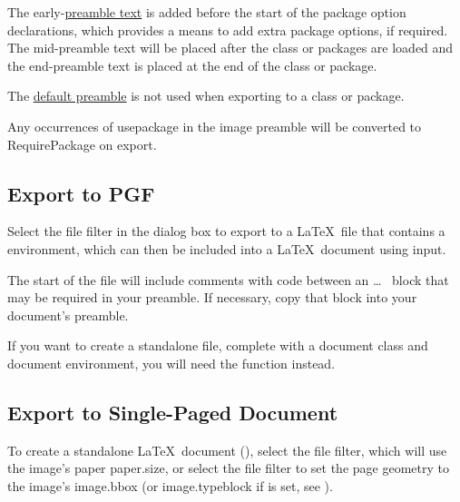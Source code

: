The early-\hyperref[sec:preamble]{preamble text} is added before the
start of the package option declarations, which provides a means to
add extra package options, if required.  The mid-preamble text will
be placed after the class or packages are loaded and the
end-preamble text is placed at the end of the class or package.

\begin{important}
The \hyperref[sec:texconfigpreamble]{default preamble} is not used
when exporting to a class or package.
\end{important}

Any occurrences of \gls{usepackage} in the image
preamble will be converted to \gls{RequirePackage} on export.


\subsection{Export to PGF}\label{sec:exportpgf}

Select the  file filter in the 
dialog box to export to a \LaTeX\ file that contains a
 environment, which can then be included into a
\LaTeX\ document using \gls{input}.

The start of the file will include comments with
code between an  \ldots\  block
that may be required in your preamble. If necessary, copy that block
into your document's preamble.

If you want to create a standalone file, complete with a document
class and document environment, you will need the
 function instead.


\subsection{Export to Single-Paged Document}\label{sec:exportdoc}

To create a standalone \LaTeX\ document (), select
the  file filter, which will use the image's
paper \gls{paper.size}, or select the  file filter to
set the page geometry to the image's \gls{image.bbox} (or \gls{image.typeblock}
if  is set, see
).

